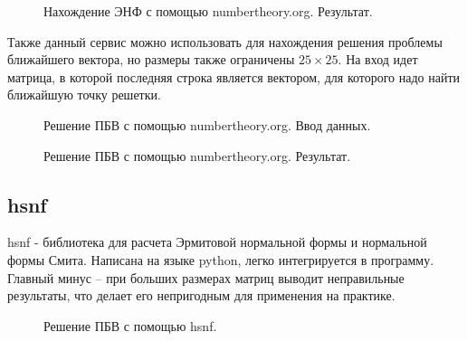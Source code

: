 \begin{figure}[H]
\caption{Нахождение ЭНФ с помощью numbertheory.org. Результат.}
\label{fig:HNF_NT_RESULT}
\end{figure}

Также данный сервис можно использовать для нахождения решения проблемы ближайшего вектора, но размеры также ограничены $ 25 \times 25 $. На вход идет матрица, в которой последняя строка является вектором, для которого надо найти ближайшую точку решетки. 

\begin{figure}[H]
\caption{Решение ПБВ с помощью numbertheory.org. Ввод данных.}
\label{fig:CVP_NT_INPUT}
\end{figure}

\begin{figure}[H]
\caption{Решение ПБВ с помощью numbertheory.org. Результат.}
\label{fig:HNF_NT_RESULT}
\end{figure}

\subsection{hsnf}

hsnf - библиотека для расчета Эрмитовой нормальной формы и нормальной формы Смита. Написана на языке python, легко интегрируется в программу. Главный минус -- при больших размерах матриц выводит неправильные результаты, что делает его непригодным для применения на практике.

\begin{figure}[H]
\caption{Решение ПБВ с помощью hsnf.}
\label{fig:HNF_NT_RESULT}
\end{figure}

\clearpage